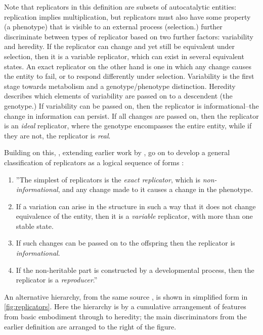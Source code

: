 Note that replicators in this definition are subsets of autocatalytic entities: replication implies multiplication, but replicators must also have some property (a phenotype) that is visible to an external process (selection.)  further discriminate between types of replicator based on two further factors: variability and heredity. If the replicator can change and yet still be equivalent under selection, then it is a variable replicator, which can exist in several equivalent states. An exact replicator on the other hand is one in which any change causes the entity to fail, or to respond differently under selection. Variability is the first stage towards metabolism and a genotype/phenotype distinction. Heredity describes which elements of variability are passed on to a descendent (the genotype.) If variability can be passed on, then the replicator is informational--the change in information can persist. If all changes are passed on, then the replicator is an \emph{ideal} replicator, where the genotype encompasses the entire entity, while if they are not, the replicator is \emph{real}.

Building on this, \citeauthor{Zachar2010}, extending earlier work by \textcite{Szathmary1999,Szathmary:2006ty}, go on to develop a general classification of replicators as a logical sequence of forms \parencite[p.21, line breaks and numbering added for emphasis]{Zachar2010}:  

\begin{enumerate}
	\item ''The simplest of replicators is the \emph{exact replicator}, which is \emph{non-informational}, and any change made to it causes a change in the phenotype. 
	\item If a variation can arise in the structure in such a way that it does not change equivalence of the entity, then it is a \emph{variable} replicator, with more than one stable state.
	\item If such changes can be passed on to the offspring then the replicator is \emph{informational}. 
	\item If the non-heritable part is constructed by a developmental process, then the replicator is a \emph{reproducer}.'' 
\end{enumerate}

An alternative hierarchy, from the same source \parencite{Zachar2010}, is shown in simplified form in \cref{fig:replicators}. Here the hierarchy is by a cumulative arrangement of features from basic embodiment through to heredity; the main discriminators from the earlier definition are arranged to the right of the figure.


